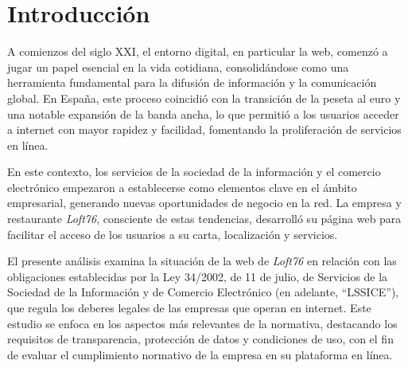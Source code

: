 \part{Introducción}
A comienzos del siglo XXI, el entorno digital, en particular la web, comenzó a jugar un papel esencial en la vida cotidiana, consolidándose como una herramienta fundamental para la difusión de información y la comunicación global. En España, este proceso coincidió con la transición de la peseta al euro y una notable expansión de la banda ancha, lo que permitió a los usuarios acceder a internet con mayor rapidez y facilidad, fomentando la proliferación de servicios en línea.

En este contexto, los servicios de la sociedad de la información y el comercio electrónico empezaron a establecerse como elementos clave en el ámbito empresarial, generando nuevas oportunidades de negocio en la red. La empresa y restaurante \textit{Loft76}, consciente de estas tendencias, desarrolló su página web para facilitar el acceso de los usuarios a su carta, localización y servicios.

El presente análisis examina la situación de la web de \textit{Loft76} en relación con las obligaciones establecidas por la Ley 34/2002, de 11 de julio, de Servicios de la Sociedad de la Información y de Comercio Electrónico \cite{LSSICE} (en adelante, ``LSSICE''), que regula los deberes legales de las empresas que operan en internet. Este estudio se enfoca en los aspectos más relevantes de la normativa, destacando los requisitos de transparencia, protección de datos y condiciones de uso, con el fin de evaluar el cumplimiento normativo de la empresa en su plataforma en línea.
